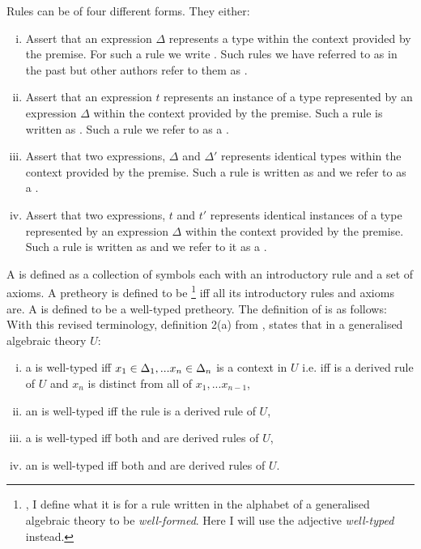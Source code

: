 Rules can be of four different forms. They either:

\begin{enumerate}[(i)]
\item Assert that an expression $\Delta$ represents a type within the context provided by the premise. For such a rule we write
. Such rules we have referred to as  \Trules in the past but other authors refer to them as .

\item Assert that an expression $t$ represents an instance of a type represented by an expression $\Delta$ within the context provided by the premise. Such a rule is written as
. Such a rule we refer to as a \trule.

\item Assert that two expressions, $\Delta$ and $\Delta'$ represents identical types within the context provided by the premise. Such a rule is written as 
 and we refer to as a \Teqrule.

\item Assert that two expressions, $t$ and $t'$ represents identical instances of a type represented by an expression $\Delta$  within the context provided by the premise. Such a rule is written as 
 and we  refer to it as a \teqrule.
\end{enumerate}


A  is defined as a collection of symbols each with an introductory rule and a set of axioms. A pretheory is defined to be \footnote{\cite{Cartmell86}, I define what it is for a rule written in the alphabet of a generalised algebraic theory to be \textit{well-formed}. Here I will use the adjective \textit{well-typed} instead.} iff all its introductory rules and axioms are. A  is defined to be a well-typed pretheory. The definition of  is as follows:
With this revised terminology, definition 2(a) from \cite{Cartmell86}, states that in  a generalised algebraic theory $U$:
\begin{enumerate} [(i)]
\item 
a \Trule {} is well-typed  iff 
$x_1 \in \Delta_1,... x_{n} \in \Delta_{n}$ is a context in $U$ i.e. iff 
 is a derived rule of $U$ and $x_n$ is distinct from all of $x_1,...x_{n-1}$, 
\item 
an \trule {} is well-typed iff
the rule  is a derived rule of $U$,
\item 
a \Teqrule {} is well-typed iff
both  and  are derived rules
of $U$,
\item 
an \teqrule {} is well-typed iff
both  and  are derived rules
of $U$.
\end{enumerate}


